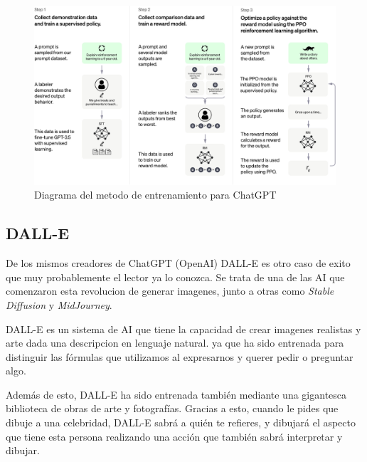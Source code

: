 \documentclass[runningheads]{llncs} %
\begin{document}
\begin{figure}
    \centering
    \includegraphics[scale=0.4]{ChatGPT_Diagram.jpg}
    \caption{Diagrama del metodo de entrenamiento
    para ChatGPT \cite{ej-chatgpt}}
    \label{fig:chatgpt-diagrama}
\end{figure}



\newpage
\subsection{DALL-E}
De los mismos creadores de ChatGPT (OpenAI) DALL-E es otro caso de exito que muy
probablemente el lector ya lo conozca. Se trata  de una de las AI que comenzaron
esta revolucion de generar imagenes, junto a otras como \textit{Stable Diffusion}
y \textit{MidJourney}. \cite{dalle-xtaka}

DALL-E es un sistema de AI que tiene la capacidad de crear imagenes realistas y arte
dada una descripcion en lenguaje natural. ya que ha sido entrenada para distinguir 
las fórmulas que utilizamos al expresarnos y querer pedir o preguntar algo. \cite{ej-dalle}

Además de esto, DALL-E ha sido entrenada también mediante una gigantesca 
biblioteca de obras de arte y fotografías. Gracias a esto, 
cuando le pides que dibuje a una celebridad, DALL-E sabrá a quién te refieres, 
y dibujará el aspecto que tiene esta persona realizando una acción que también 
sabrá interpretar y dibujar. \cite{dalle-xtaka}
\end{document}
